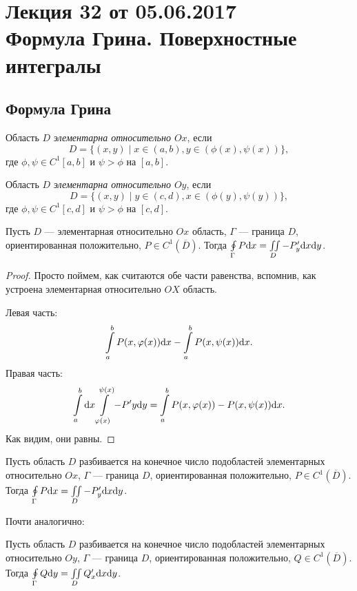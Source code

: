 \section{Лекция 32 от 05.06.2017 \\ Формула Грина. Поверхностные интегралы}
\subsection{Формула Грина}
\begin{Def}
Область $D$ \textit{элементарна относительно $Ox$}, если 
$$D = \{ (x, y) \mid x \in (a, b), y \in (\phi(x), \psi(x)) \},$$
где $\phi, \psi \in C^{1}[a, b]$ и $\psi > \phi$ на $[a, b]$.
\end{Def}
\begin{Def}
Область $D$ \textit{элементарна относительно $Oy$}, если 
$$D = \{ (x, y) \mid y \in (c, d), x \in (\phi(y), \psi(y)) \},$$
где $\phi, \psi \in C^{1}[c, d]$ и $\psi > \phi$ на $[c, d]$.
\end{Def}

\begin{Lemma}
Пусть $D$ --- элементарная относительно $Ox$ область, $\Gamma$ --- граница $D$, ориентированная положительно, $P \in C^1(\overline{D})$. Тогда $\oint\limits_\Gamma P\mathrm{d}x = \iint\limits_D - P'_y\mathrm{d}x \mathrm{d} y$.
\end{Lemma}
\begin{proof}
Просто поймем, как считаются обе части равенства, вспомнив, как устроена элементарная относительно $OX$ область.

Левая часть:
$$
\int\limits_a^b P(x,\varphi(x))\mathrm{d}x - \int\limits_a^bP(x, \psi(x))\mathrm{d}x.
$$
Правая часть:
$$
\int\limits_a^b\mathrm{d}x\int\limits_{\varphi(x)}^{\psi(x)} -P'y\mathrm{d} y = \int\limits_a^bP(x, \varphi(x)) - P(x, \psi(x))\mathrm{d}x.
$$
Как видим, они равны.
\end{proof}

\begin{Consequence}
Пусть область $D$ разбивается на конечное число подобластей элементарных относительно  $Ox$, $\Gamma$ --- граница $D$, ориентированная положительно, $P \in C^1(\overline{D})$. Тогда $\oint\limits_\Gamma P\mathrm{d}x = \iint\limits_D - P'_y\mathrm{d}x \mathrm{d} y$.
\end{Consequence}

Почти аналогично:
\begin{Consequence}
Пусть область $D$ разбивается на конечное число подобластей элементарных относительно  $Oy$, $\Gamma$ --- граница $D$, ориентированная положительно, $Q \in C^1(\overline{D})$. Тогда $\oint\limits_\Gamma Q\mathrm{d} y = \iint\limits_D Q'_x\mathrm{d}x \mathrm{d} y$.
\end{Consequence}

